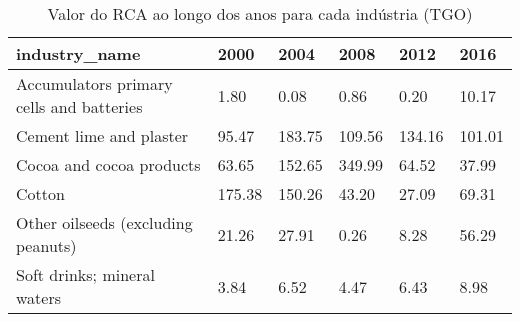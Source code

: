 \begin{table}
\centering
\caption{Valor do RCA ao longo dos anos para cada indústria (TGO)}
\begin{tabular}{p{6cm}p{1.5cm}p{1.5cm}p{1.5cm}p{1.5cm}p{1.5cm}}
\toprule
                           industry\_name &   2000 &   2004 &   2008 &   2012 &   2016 \\
\midrule
Accumulators primary cells and batteries &   1.80 &   0.08 &   0.86 &   0.20 &  10.17 \\
                 Cement lime and plaster &  95.47 & 183.75 & 109.56 & 134.16 & 101.01 \\
                Cocoa and cocoa products &  63.65 & 152.65 & 349.99 &  64.52 &  37.99 \\
                                  Cotton & 175.38 & 150.26 &  43.20 &  27.09 &  69.31 \\
      Other oilseeds (excluding peanuts) &  21.26 &  27.91 &   0.26 &   8.28 &  56.29 \\
             Soft drinks; mineral waters &   3.84 &   6.52 &   4.47 &   6.43 &   8.98 \\
\bottomrule
\end{tabular}
\end{table}
